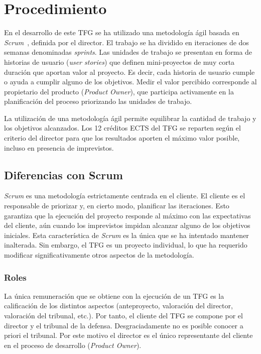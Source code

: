 \chapter{Procedimiento}
\label{ch:procedimiento}


En el desarrollo de este TFG se ha utilizado una metodología ágil basada en \emph{Scrum}~\cite{scrumguide}, definida por el director.  El trabajo se ha dividido en iteraciones de dos semanas denominadas \emph{sprints}.  Las unidades de trabajo se presentan en forma de historias de usuario (\emph{user stories}) que definen mini-proyectos de muy corta duración que aportan valor al proyecto.  Es decir, cada historia de usuario cumple o ayuda a cumplir alguno de los objetivos.  Medir el valor percibido corresponde al propietario del producto (\emph{Product Owner}), que participa activamente en la planificación del proceso priorizando las unidades de trabajo.

La utilización de una metodología ágil permite equilibrar la cantidad de trabajo y los objetivos alcanzados.  Los 12 créditos ECTS del TFG se reparten según el criterio del director para que los resultados aporten el máximo valor posible, incluso en presencia de imprevistos.

\section{Diferencias con Scrum}

\emph{Scrum} es una metodología estrictamente centrada en el cliente.  El cliente es el responsable de priorizar y, en cierto modo, planificar las iteraciones.  Esto garantiza que la ejecución del proyecto responde al máximo con las expectativas del cliente, aún cuando los imprevistos impidan alcanzar alguno de los objetivos iniciales.  Esta característica de \emph{Scrum} es la única que se ha intentado mantener inalterada.  Sin embargo, el TFG es un proyecto individual, lo que ha requerido modificar significativamente otros aspectos de la metodología.

\subsection{Roles}

La única remuneración que se obtiene con la ejecución de un TFG es la calificación de los distintos aspectos (anteproyecto, valoración del director, valoración del tribunal, etc.).  Por tanto, el cliente del TFG se compone por el director y el tribunal de la defensa.  Desgraciadamente no es posible conocer a priori el tribunal.  Por este motivo el director es el único representante del cliente en el proceso de desarrollo (\emph{Product Owner}).

